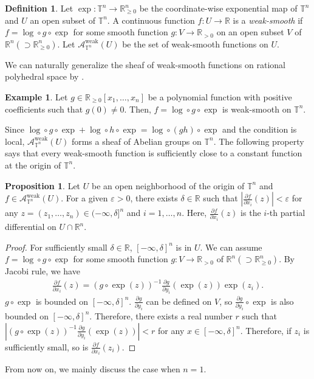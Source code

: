 \documentclass[a4paper,dvipdfmx,reqno,12pt]{amsart}
\theoremstyle{definition}
\newtheorem{definition}[theorem]{Definition}
\newtheorem{example}[theorem]{Example}
\newtheorem{proposition}[theorem]{Proposition}
\newcommand{\vep}{\varepsilon}%
\newcommand{\opn}[1]{\operatorname{#1}}
\numberwithin{equation}{section}
\begin{document}
\begin{definition} \label{definition-weak-smooth}
Let $\opn{exp}\colon \mathbb{T}^{n}\to 
\mathbb{R}_{\geq 0}^{n}$ be the coordinate-wise 
exponential map of 
$\mathbb{T}^{n}$ and $U$ an open subset of 
$\mathbb{T}^{n}$.
A continuous function $f\colon U\to \mathbb{R}$
is a \emph{weak-smooth} if 
$f=\opn{log}\circ g\circ \opn{exp}$ for some 
smooth function $g\colon V\to \mathbb{R}_{>0}$ on 
an open subset $V$ of $\mathbb{R}^{n} 
(\supset \mathbb{R}_{\geq 0}^{n})$.
Let $\mathcal{A}_{\mathbb{T}^{n}}^{\mathrm{weak}}(U)$ 
be the set of weak-smooth functions on $U$.
\end{definition}
We can naturally generalize the sheaf of weak-smooth functions 
on rational polyhedral space by 
\cite[Lemma 9]{itenbergTropicalHomology2019b}.
\begin{example}
Let 
$g\in \mathbb{R}_{\geq 0}[x_1,\ldots,x_n]$ be a polynomial 
function with positive coefficients such that $g(0)\ne 0$. 
Then, $f=\opn{log}\circ g \circ \opn{exp}$ is weak-smooth 
on $\mathbb{T}^{n}$.
\end{example}

Since $\opn{log}\circ g\circ\opn{exp}+\opn{log}\circ h
\circ \opn{exp}=\opn{log}\circ(gh)\circ\opn{exp}$ and 
the condition is local, 
$\mathcal{A}_{\mathbb{T}^{n}}^{\opn{weak}}(U)$ forms a 
sheaf of Abelian groups on $\mathbb{T}^{n}$. 
The following property says that every weak-smooth 
function is sufficiently close to a constant function 
at the origin of $\mathbb{T}^{n}$.
\begin{proposition}
Let $U$ be an open neighborhood of the origin of 
$\mathbb{T}^{n}$ and 
 $f\in \mathcal{A}_{\mathbb{T}^{n}}^{\mathrm{weak}}(U)$.
For a given $\vep >0$, there exists $\delta\in \mathbb{R}$
such that $|\frac{\partial f}{\partial x_i}(z)|<\vep$
for any $z=(z_1,\ldots,z_n) \in (-\infty,\delta]^{n}$ and $i=1,\ldots,n$. 
Here, $\frac{\partial f}{\partial x_i}(z)$ is the $i$-th partial 
differential on $U\cap \mathbb{R}^{n}$.
\end{proposition}
\begin{proof}
For sufficiently small $\delta\in \mathbb{R}$, 
$[-\infty,\delta]^{n}$ is in $U$. 
We can assume $f=\opn{log}\circ g\circ \opn{exp}$ for
some smooth function 
$g\colon V\to \mathbb{R}_{>0}$ of $\mathbb{R}^{n} 
(\supset \mathbb{R}_{\geq 0}^{n})$.
By Jacobi rule, we have
\begin{align}
\frac{\partial f}{\partial x_i}(z)=(g\circ \opn{exp}(z))^{-1} 
\frac{\partial g}{\partial y_i}(\opn{exp}(z))\opn{exp}(z_i).
\end{align}
$g\circ \opn{exp}$ is bounded on $[-\infty,\delta]^{n}$.
$\frac{\partial g}{\partial y_i}$ can be defined 
on $V$, so $\frac{\partial g}{\partial y_i}\circ \opn{exp}$
is also bounded on $[-\infty,\delta]^{n}$.
Therefore, there exists a real number $r$ such that
$|(g\circ \opn{exp}(z))^{-1} 
\frac{\partial g}{\partial y_i}(\opn{exp}(z))|<r$ for any 
$x\in [-\infty,\delta]^{n}$.
Therefore, if $z_i$ is sufficiently small, so is 
$\frac{\partial f}{\partial x_i}(z_i)$. 
\end{proof}
From now on, we mainly discuss the case when $n=1$.
\end{document}
